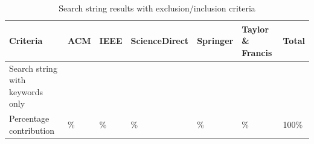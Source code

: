 \begin{table}[ht]
    \renewcommand{\arraystretch}{1.3}
    \centering
	\caption{Search string results with exclusion/inclusion criteria}
	\begin{tabular}{p{4.4cm}p{0.9cm}p{0.9cm}p{2.4cm}p{1.4cm}p{2.5cm}p{0.9cm}}
        \hline
        \textbf{Criteria}                         & \textbf{ACM} & \textbf{IEEE} & \textbf{ScienceDirect} & \textbf{Springer} & \textbf{Taylor \& Francis} & \textbf{Total} \\
        \hline
        Search string with keywords only & \iacm{}      & \iieee{}      & \isd{}                 & \ispr{}           & \itf{}                     & \itot{}        \\
        Percentage contribution          & \iacmp{}\%   & \iieeep{}\%   & \isdp{}\%              & \isprp{}\%        & \itfp{}\%                  & 100\%          \\
        \hline
    \end{tabular}
	\label{table:search_results_exclusion}
\end{table}
